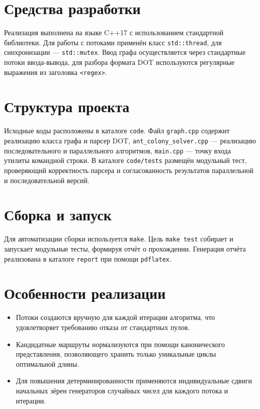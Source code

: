 
\section*{Средства разработки}
Реализация выполнена на языке C++17 с использованием стандартной библиотеки. Для работы с
потоками применён класс \texttt{std::thread}, для синхронизации --- \texttt{std::mutex}. Ввод
графа осуществляется через стандартные потоки ввода-вывода, для разбора формата DOT
используются регулярные выражения из заголовка \texttt{<regex>}.

\section*{Структура проекта}
Исходные коды расположены в каталоге \texttt{code}. Файл \texttt{graph.cpp} содержит реализацию
класса графа и парсер DOT, \texttt{ant\_colony\_solver.cpp} --- реализацию последовательного и
параллельного алгоритмов, \texttt{main.cpp} --- точку входа утилиты командной строки. В каталоге
\texttt{code/tests} размещён модульный тест, проверяющий корректность парсера и согласованность
результатов параллельной и последовательной версий.

\section*{Сборка и запуск}
Для автоматизации сборки используется \texttt{make}. Цель \texttt{make test} собирает и запускает
модульные тесты, формируя отчёт о прохождении. Генерация отчёта реализована в каталоге
\texttt{report} при помощи \texttt{pdflatex}.

\section*{Особенности реализации}
\begin{itemize}
        \item Потоки создаются вручную для каждой итерации алгоритма, что удовлетворяет требованию отказа от стандартных пулов.
        \item Кандидатные маршруты нормализуются при помощи канонического представления, позволяющего хранить только уникальные циклы оптимальной длины.
        \item Для повышения детерминированности применяются индивидуальные сдвиги начальных зёрен генераторов случайных чисел для каждого потока и итерации.
\end{itemize}

\clearpage
